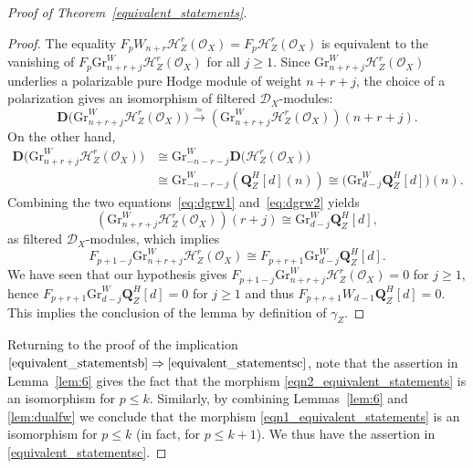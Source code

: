 \documentclass[11pt]{article}
\numberwithin{equation}{section}
\newcommand{\DXmodules}{$\cD_X$\nobreakdash-mod\-ules\xspace}
\theoremstyle{plain}
\theoremstyle{definition}
\newcommand\bD{{\mathbf D}}
\newcommand\Q{{\mathbf Q}}
\newcommand\cD{\mathcal{D}}
\newcommand\cH{\mathcal{H}}
\newcommand\cO{\mathcal{O}}
\newcommand\cH{\mathcal{H}}
\newcommand\cO{\mathcal{O}}
\newcommand\gr{\mathrm{Gr}}
\begin{document}
\begin{proof}[Proof of Theorem~\ref{equivalent_statements}]
\begin{proof}
The equality $F_pW_{n+r}\cH^r_Z(\cO_X)=F_p\cH^r_Z(\cO_X)$ is equivalent to the vanishing of
$F_p \gr^W_{n+r+j}\cH^r_Z(\cO_X)$ for all $j\geq 1$. Since $\gr^W_{n+r+j}\cH^r_Z(\cO_X)$ underlies a polarizable pure Hodge module of weight $n+r+j$, the choice of a polarization gives an isomorphism of filtered \DXmodules:
\begin{equation}\label{eq:dgrw1}
\bD\big(\gr^W_{n+r+j}\cH^r_Z(\cO_X)\big) \overset{\simeq}\longrightarrow \left(\gr^W_{n+r+j}\cH^r_Z(\cO_X)\right) (n+r+j).
\end{equation}
On the other hand,
\begin{equation}\label{eq:dgrw2}
\begin{aligned}
\bD\big(\gr^W_{n+r+j}\cH^r_Z(\cO_X)\big) &\cong \gr^W_{-n-r-j} \bD\big(\cH^r_Z(\cO_X)\big) \\
& \cong \gr^W_{-n-r-j} \left(\Q_Z^H[d](n)\right) \cong \big(\gr^W_{d-j} \Q_Z^H[d]\big)(n).
\end{aligned}
\end{equation}
Combining the two equations~\eqref{eq:dgrw1} and~\eqref{eq:dgrw2} yields\vspace*{-3pt}
\[
\left(\gr^W_{n+r+j}\cH^r_Z(\cO_X)\right) (r+j) \cong \gr^W_{d-j}\Q_Z^H[d],
\]
as filtered \DXmodules, which implies\vspace*{-3pt}\enlargethispage{\baselineskip}
\[
F_{p+1-j} \gr^W_{n+r+j}\cH^r_Z(\cO_X) \cong F_{p+r+1} \gr^W_{d-j}\Q^H_Z[d].
\]
We have seen that our hypothesis gives $F_{p+1-j} \gr^W_{n+r+j}\cH^r_Z(\cO_X)=0$ for $j\geq 1$, hence
$F_{p+r+1} \gr^W_{d-j}\Q_Z^H[d]=0$ for $j\geq 1$ and thus
$F_{p+r+1} W_{d-1}\Q_Z^H[d]=0$. This implies the conclusion of the lemma by definition of $\gamma_Z$.
\end{proof}

Returning to the proof of the implication $\eqref{equivalent_statementsb}\Rightarrow\eqref{equivalent_statementsc}$,
note that the assertion in Lemma~\ref{lem:6}
gives the fact that the morphism \eqref{eqn2_equivalent_statements} is an isomorphism for $p\leq k$.
Similarly, by combining Lemmas~\ref{lem:6} and \ref{lem:dualfw} we conclude that the morphism
\eqref{eqn1_equivalent_statements} is an isomorphism for $p\leq k$ (in fact, for $p\leq k+1$). We thus have the assertion in \eqref{equivalent_statementsc}.


\end{proof}
\end{document}
